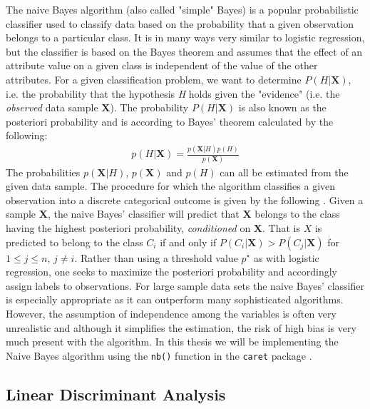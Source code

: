 \documentclass[../thesis.tex]{subfiles}
\begin{document}
\noindent The naive Bayes algorithm (also called "simple" Bayes) is a popular probabilistic classifier used to classify data based on the probability that a given observation belongs to a particular class. It is in many ways very similar to logistic regression, but the classifier is based on the Bayes theorem and assumes that the effect of an attribute value on a given class is independent of the value of the other attributes. For a given classification problem, we want to determine $P(H | \boldsymbol{X})$, i.e. the probability that the hypothesis \textit{H} holds given the "evidence" (i.e. the \textit{observed} data sample $\boldsymbol{X}$). The probability $P(H | \boldsymbol{X})$ is also known as the posteriori probability and is according to Bayes' theorem calculated by the following:
\begin{align}
    p(H | \boldsymbol{X}) = \frac{p(\boldsymbol{X}|H) p(H)}{p(\boldsymbol{X})} 
\end{align}
\noindent The probabilities $p(\boldsymbol{X}|H)$, $p(\boldsymbol{X})$ and $p(H)$ can all be estimated from the given data sample. The procedure for which the algorithm classifies a given observation into a discrete categorical outcome is given by the following \citep{leung2007naive}. Given a sample $\boldsymbol{X}$, the naive Bayes' classifier will predict that $\boldsymbol{X}$ belongs to the class having the highest posteriori probability, \textit{conditioned} on $\boldsymbol{X}$. That is $X$ is predicted to belong to the class $C_i$ if and only if $P(C_i| \boldsymbol{X}) > P(C_j | \boldsymbol{X})$ for $1 \leq j \leq n$, $j \neq i$. Rather than using a threshold value $p^\star$ as with logistic regression, one seeks to maximize the posteriori probability and accordingly assign labels to observations. For large sample data sets the naive Bayes' classifier is especially appropriate as it can outperform many sophisticated algorithms. However, the assumption of independence among the variables is often very unrealistic and although it simplifies the estimation, the risk of high bias is very much present with the algorithm. In this thesis we will be implementing the Naive Bayes algorithm using the \texttt{nb()} function in the \texttt{caret} package \citep{kuhncaret}.

\subsection{Linear Discriminant Analysis}
\label{subsec:lda}
\end{document}
